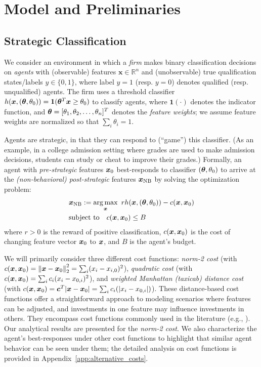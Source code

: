 \section{Model and Preliminaries}\label{sec:model}

\subsection{Strategic Classification} 

We consider an environment in which a \emph{firm} makes binary classification decisions on \emph{agents} with (observable) features $\mathbf{x}\in\mathbb{R}^n$ and (unobservable) true qualification states/labels $y\in\{0,1\}$, where label $y=1$ (resp. $y=0$) denotes qualified (resp. unqualified) agents. The firm uses a threshold classifier $h({\bm{x}}, ({\bm{\theta}}, \theta_0))=\mathbf{1}({\bm{\theta}}^T{\bm{x}}\geq \theta_0)$ to classify agents, where $\mathbf{1}(\cdot)$ denotes the indicator function, and ${\bm{\theta}}=[\theta_1, \theta_2, \ldots, \theta_n]^T$ denotes the \emph{feature weights}; we assume feature weights are normalized so that $\sum_i \theta_i=1$. 

Agents are strategic, in that they can respond to (``game'') this classifier. (As an example, in a college admission setting where grades are used to make admission decisions, students can study or cheat to improve their grades.) Formally, an agent with \emph{pre-strategic} features ${\bm{x}}_0$ best-responds to classifier $({\bm{\theta}}, \theta_0)$ to arrive at the \emph{(non-behavioral) post-strategic} features ${\bm{x}}_{\text{NB}}$ by solving the optimization problem:
\begin{align}\label{eq:agent-optimization}
    &{\bm{x}}_\text{NB} := \operatorname*{arg\,max}_{\bm{x}} ~ rh({\bm{x}}, ({\bm{\theta}}, \theta_0))-c({\bm{x}}, {\bm{x}}_0) \notag\\
    &\text{subject to}\quad c({\bm{x}}, {\bm{x}}_0)\le B
\end{align}
where $r>0$ is the reward of positive classification, $c({\bm{x}}, {\bm{x}}_0)$ is the cost of changing feature vector ${\bm{x}}_0$ to ${\bm{x}}$, and $B$ is the agent's budget. 

We will primarily consider three different cost functions: \emph{norm-2 cost} (with $c({\bm{x}}, {\bm{x}}_0) = \norm{{\bm{x}}-{\bm{x}}_0}_2^2=\sum_i (x_i-x_{i,0})^2$), \emph{quadratic cost} {(with $c({\bm{x}}, {\bm{x}}_0) = \sum_i c_i(x_{i}-x_{0,i})^2$)}, and \emph{weighted Manhattan (taxicab) distance cost} (with $c({\bm{x}}, {\bm{x}}_0)={\bm{c}}^T|{\bm{x}}-{\bm{x}}_0|=\sum_i c_i(|x_{i}-x_{0,i}|)$). These distance-based cost functions offer a straightforward approach to modeling scenarios where features can be adjusted, and investments in one feature may influence investments in others. They encompass cost functions commonly used in the literature (e.g., \cite{dong2018strategic, ahmadi2021strategic, Perdomo2020performative, Hu2019disparate, Milli2019socialcost}). Our analytical results are presented for the \emph{norm-2 cost}. We also characterize the agent's best-responses under other cost functions to highlight that similar agent behavior can be seen under them; the detailed analysis on cost functions is provided in Appendix~\ref{app:alternative_costs}. 


